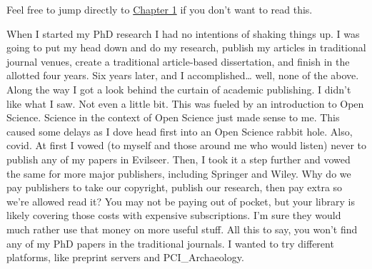 \documentclass[
  b5paper,
]{book}
\begin{document}
Feel free to jump directly to \href{01-intro.qmd}{Chapter 1} if you
don't want to read this.

When I started my PhD research I had no intentions of shaking things up.
I was going to put my head down and do my research, publish my articles
in traditional journal venues, create a traditional article-based
dissertation, and finish in the allotted four years. Six years later,
and I accomplished\ldots{} well, none of the above. Along the way I got
a look behind the curtain of academic publishing. I didn't like what I
saw. Not even a little bit. This was fueled by an introduction to Open
Science. Science in the context of Open Science just made sense to me.
This caused some delays as I dove head first into an Open Science rabbit
hole. Also, covid. At first I vowed (to myself and those around me who
would listen) never to publish any of my papers in Evilseer. Then, I
took it a step further and vowed the same for more major publishers,
including Springer and Wiley. Why do we pay publishers to take our
copyright, publish our research, then pay extra so we're allowed read
it? You may not be paying out of pocket, but your library is likely
covering those costs with expensive subscriptions. I'm sure they would
much rather use that money on more useful stuff. All this to say, you
won't find any of my PhD papers in the traditional journals. I wanted to
try different platforms, like preprint servers and PCI\_Archaeology.
\end{document}
